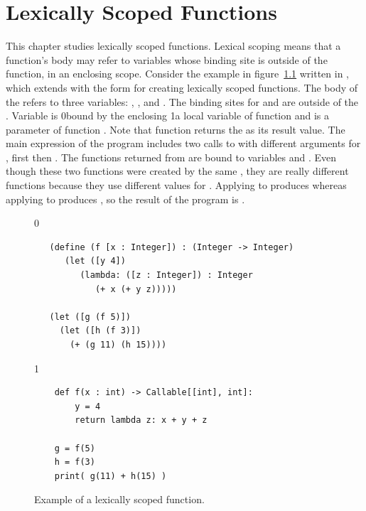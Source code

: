 \documentclass[7x10]{TimesAPriori_MIT}%
\def\racketEd{0}
\def\pythonEd{1}
\def\edition{0}
\newcommand{\racket}[1]{{\if\edition\racketEd{#1}\fi}}
\newcommand{\python}[1]{{\if\edition\pythonEd #1\fi}}
\numberwithin{theorem}{chapter}
\numberwithin{definition}{chapter}
\numberwithin{equation}{chapter}
\begin{document}




\chapter{Lexically Scoped Functions}
\label{ch:Llambda}
\setcounter{footnote}{0}

This chapter studies lexically scoped functions. Lexical scoping means
that a function's body may refer to variables whose binding site is
outside of the function, in an enclosing scope.
%
Consider the example in figure~\ref{fig:lexical-scoping} written in
\LangLam{}, which extends \LangFun{} with the  form for
creating lexically scoped functions.  The body of the 
refers to three variables: , , and . The
binding sites for  and  are outside of the
. Variable  is \racket{bound by the enclosing
  }\python{a local variable of function } and
 is a parameter of function . Note that function
 returns the  as its result value. The main
expression of the program includes two calls to  with
different arguments for , first  then . The
functions returned from  are bound to variables  and
. Even though these two functions were created by the same
, they are really different functions because they use
different values for . Applying  to  produces
 whereas applying  to  produces ,
so the result of the program is .

\begin{figure}[btp]
  \begin{tcolorbox}[colback=white]
    {\if\edition\racketEd
\begin{lstlisting}
   (define (f [x : Integer]) : (Integer -> Integer)
      (let ([y 4])
         (lambda: ([z : Integer]) : Integer
            (+ x (+ y z)))))

   (let ([g (f 5)])
     (let ([h (f 3)])
       (+ (g 11) (h 15))))
\end{lstlisting}
\fi}
{\if\edition\pythonEd
\begin{lstlisting}
    def f(x : int) -> Callable[[int], int]:
        y = 4
        return lambda z: x + y + z

    g = f(5)
    h = f(3)
    print( g(11) + h(15) )
\end{lstlisting}
\fi}
  \end{tcolorbox}

  \caption{Example of a lexically scoped function.}
\label{fig:lexical-scoping}
\end{figure}
\end{document}
